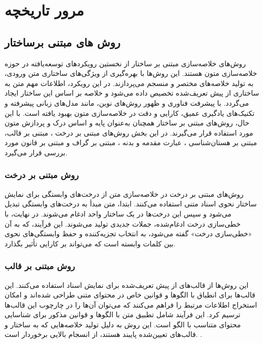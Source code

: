 \chapter{مرور تاریخچه}

\section{روش های مبتنی برساختار}
روش‌های خلاصه‌سازی مبتنی بر ساختار از نخستین رویکردهای توسعه‌یافته در حوزه خلاصه‌سازی متون هستند. این روش‌ها با بهره‌گیری از ویژگی‌های ساختاری متن ورودی، به تولید خلاصه‌های مختصر و منسجم می‌پردازند. در این رویکرد، اطلاعات مهم متن به ساختاری از پیش تعریف‌شده تخصیص داده می‌شود و خلاصه بر اساس این ساختار ایجاد می‌گردد. با پیشرفت فناوری و ظهور روش‌های نوین، مانند مدل‌های زبانی پیشرفته و تکنیک‌های یادگیری عمیق، کارایی و دقت در خلاصه‌سازی متون بهبود یافته است. با این حال، روش‌های مبتنی بر ساختار همچنان به‌عنوان پایه و اساس درک و پردازش متون مورد استفاده قرار می‌گیرند. در این بخش روش‌های مبتنی بر درخت 
، مبتنی بر قالب،
مبتنی بر هستان‌شناسی
، عبارت مقدمه و بدنه
، مبتنی بر گراف
و مبتنی بر قانون
مورد بررسی قرار می‌گیرد. 

\subsection{روش مبتنی بر درخت}
روش‌های مبتنی بر درخت در خلاصه‌سازی متن از درخت‌های وابستگی برای نمایش ساختار نحوی اسناد متنی استفاده می‌کنند. ابتدا، متن مبدأ به درخت‌های وابستگی تبدیل می‌شود و سپس این درخت‌ها در یک ساختار واحد ادغام می‌شوند. در نهایت، با خطی‌سازی درخت ادغام‌شده، جملات جدیدی تولید می‌شوند. این فرآیند، که به آن «خطی‌سازی درخت» گفته می‌شود، به انتخاب تجزیه‌کننده و حفظ وابستگی‌های نحوی بین کلمات وابسته است که می‌تواند بر کارایی تأثیر بگذارد\cite{andhale2016overview}.
\subsection{روش مبتنی بر قالب}
این روش‌ها از قالب‌های از پیش تعریف‌شده برای نمایش اسناد استفاده می‌کنند. این قالب‌ها برای انطباق با الگوها و قوانین خاص در محتوای متنی طراحی شده‌اند و امکان استخراج اطلاعات مرتبط را فراهم می‌کنند که می‌توان آن‌ها را در چارچوب این قالب‌ها ترسیم کرد. این فرآیند شامل تطبیق متن با الگوها و قوانین مذکور برای شناسایی محتوای متناسب با الگو است. این روش به دلیل تولید خلاصه‌هایی که به ساختار و قالب‌های تعیین‌شده پایبند هستند، از انسجام بالایی برخوردار است. \cite{andhale2016overview}.
